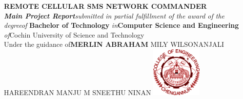 \documentclass[a4size paper,12pt]{article}
\begin{document}
\onehalfspacing

\begin{center}
\large

\hfill


\begingroup
{\LARGE\textbf{REMOTE CELLULAR SMS NETWORK COMMANDER }} \\ %
\endgroup
\begingroup
{\large \textit{ \textbf{Main Project Report}\linebreak submitted in partial fulfillment of the award of the degree\linebreak of\linebreak} \textbf{Bachelor of Technology}\linebreak
\textit{in}\linebreak \textbf{Computer Science and Engineering} \linebreak
\textit{of}\linebreak Cochin University of Science and Technology}\vspace{.5cm} \\ \bigskip
{\large{Under the guidance of\linebreak \textbf{MERLIN ABRAHAM\linebreak
}}}
\endgroup
\begingroup
\bigskip
{\large \linebreak MILY WILSON\linebreak ANJALI HAREENDRAN \linebreak MANJU M S\linebreak NEETHU NINAN}
\endgroup
\vfill
\includegraphics[height=2.5cm,width=2.5cm]{emblem1.png} \\ \bigskip %
\vfill



\end{center}
\pagestyle{empty}
\newpage


\pagestyle{empty}

\newpage
\end{document}
